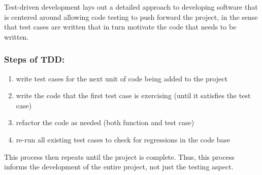 \documentclass[10pt,twocolumn]{article}
\begin{document}
Test-driven development lays out a detailed approach to developing software that is centered around allowing 
code testing to push forward the project, in the sense that test cases are written that in turn motivate the code 
that needs to be written. 

\subsubsection*{Steps of TDD:}
\begin{enumerate}
    \item write test cases for the next unit of code being added to the project
    \item write the code that the first test case is exercising (until it satisfies the test case)
    \item refactor the code as needed (both function and test case)
    \item re-run all existing test cases to check for regressions in the code base \cite{Bhat2006Article}
\end{enumerate}
This process then repeats until the project is complete. Thus, this process informs the 
development of the entire project, not just the testing aspect. 

 

\end{document}
